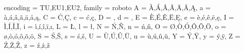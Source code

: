 \usepackage{fancyhdr}
\pagestyle{fancy}

\DeclareCharacterInheritance
   { encoding = {TU,EU1,EU2},
     family   = {roboto} }
   { A = {\`A,\'A,\^A,\~A,\"A,\r A,\k A},
     a = {\`a,\'a,\^a,\~a,\"a,\r a,\k a},
     C = {\'C,\c C},
     c = {\'c,\c c},
     D = {\DH},
     d = {\dj},
     E = {\`E,\'E,\^E,\"E,\k E},
     e = {\`e,\'e,\^e,\"e,\k e},
     I = {\`I,\'I,\^I,\"I},
     i = {\`i,\'i,\^i,\"i,\i},
     L = {\L},
     l = {\l},
     N = {\'N,\~N},
     n = {\'n,\~n},
     O = {\O,\`O,\'O,\^O,\~O,\"O},
     o = {\o,\`o,\'o,\^o,\~o,\"o},
     S = {\'S,\v S},
     s = {\'s,\v s},
     U = {\`U,\'U,\^U,\"U},
     u = {\`u,\'u,\^u,\"u},
     Y = {\'Y,\"Y},
     y = {\'y,\"y},
     Z = {\'Z,\.Z,\v Z},
     z = {\'z,\.z,\v z}
   }

\makeatletter
\def\MT@warn@unknown{}
\makeatother
\setlength{\headheight}{13.59999pt}


